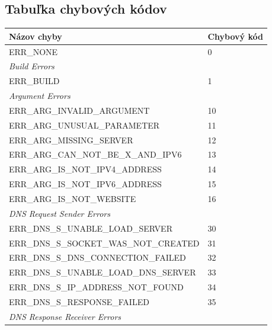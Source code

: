 \documentclass[a4paper, 11pt]{article}
\begin{document}
	\subsection{Tabuľka chybových kódov}
	\label{subsection:res_errCodes}
	\begin{table}[h]
		\centering
		\begin{tabularx}{\textwidth}{|X|l|}
		\hline
		\textbf{Názov chyby}                    & \textbf{Chybový kód} \\ \hline
		ERR\_NONE                              & 0                   \\ \hline
		\multicolumn{2}{|X|}{\textit{Build Errors}}                    \\ \hline
		ERR\_BUILD                             & 1                   \\ \hline
		\multicolumn{2}{|X|}{\textit{Argument Errors}}                 \\ \hline
		ERR\_ARG\_INVALID\_ARGUMENT            & 10                  \\ \hline
		ERR\_ARG\_UNUSUAL\_PARAMETER           & 11                  \\ \hline
		ERR\_ARG\_MISSING\_SERVER              & 12                  \\ \hline
		ERR\_ARG\_CAN\_NOT\_BE\_X\_AND\_IPV6   & 13                  \\ \hline
		ERR\_ARG\_IS\_NOT\_IPV4\_ADDRESS       & 14                  \\ \hline
		ERR\_ARG\_IS\_NOT\_IPV6\_ADDRESS       & 15                  \\ \hline
		ERR\_ARG\_IS\_NOT\_WEBSITE             & 16                  \\ \hline
		\multicolumn{2}{|X|}{\textit{DNS Request Sender Errors}}       \\ \hline
		ERR\_DNS\_S\_UNABLE\_LOAD\_SERVER      & 30                  \\ \hline
		ERR\_DNS\_S\_SOCKET\_WAS\_NOT\_CREATED & 31                  \\ \hline
		ERR\_DNS\_S\_DNS\_CONNECTION\_FAILED   & 32                  \\ \hline
		ERR\_DNS\_S\_UNABLE\_LOAD\_DNS\_SERVER & 33                  \\ \hline
		ERR\_DNS\_S\_IP\_ADDRESS\_NOT\_FOUND   & 34                  \\ \hline
		ERR\_DNS\_S\_RESPONSE\_FAILED          & 35                  \\ \hline
		\multicolumn{2}{|X|}{\textit{DNS Response Receiver Errors}}    \\ \hline

\end{tabularx}
\end{table}
\end{document}
